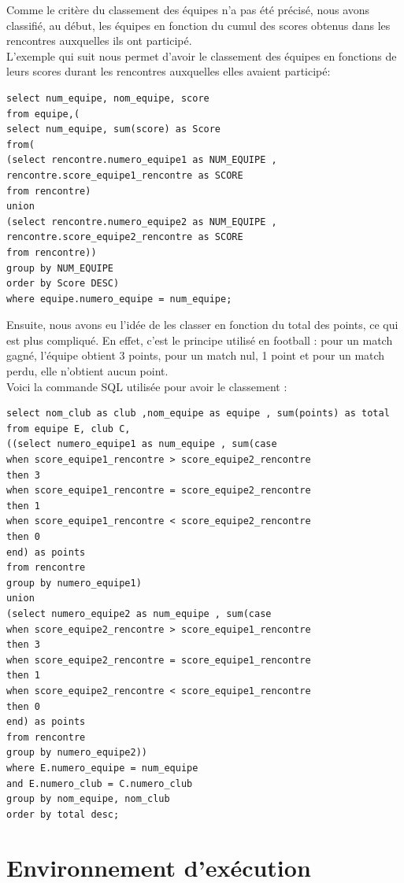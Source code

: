 \documentclass{article}
\begin{document}
Comme le critère du classement des équipes n'a pas été précisé, nous avons classifié, au début, les équipes en fonction du cumul des scores obtenus dans les rencontres auxquelles ils ont participé. \\
L'exemple qui suit nous permet d'avoir le classement des équipes en fonctions de leurs scores durant les rencontres auxquelles elles avaient participé: \\

\begin{verbatim}
select num_equipe, nom_equipe, score
from equipe,(
select num_equipe, sum(score) as Score
from(
(select rencontre.numero_equipe1 as NUM_EQUIPE , rencontre.score_equipe1_rencontre as SCORE
from rencontre)
union
(select rencontre.numero_equipe2 as NUM_EQUIPE , rencontre.score_equipe2_rencontre as SCORE
from rencontre))
group by NUM_EQUIPE
order by Score DESC)
where equipe.numero_equipe = num_equipe;
\end{verbatim}

Ensuite, nous avons eu l'idée de les classer en fonction du total des points, ce qui est plus compliqué. En effet, c'est le principe utilisé en football : pour un match gagné, l'équipe obtient 3 points, pour un match nul, 1 point et pour un match perdu, elle n'obtient aucun point.  \\
Voici la commande SQL utilisée pour avoir le classement : \\

\begin{verbatim}
select nom_club as club ,nom_equipe as equipe , sum(points) as total
from equipe E, club C,
((select numero_equipe1 as num_equipe , sum(case
when score_equipe1_rencontre > score_equipe2_rencontre 
then 3
when score_equipe1_rencontre = score_equipe2_rencontre 
then 1
when score_equipe1_rencontre < score_equipe2_rencontre
then 0
end) as points
from rencontre
group by numero_equipe1)
union
(select numero_equipe2 as num_equipe , sum(case
when score_equipe2_rencontre > score_equipe1_rencontre 
then 3
when score_equipe2_rencontre = score_equipe1_rencontre 
then 1
when score_equipe2_rencontre < score_equipe1_rencontre
then 0
end) as points
from rencontre
group by numero_equipe2))
where E.numero_equipe = num_equipe
and E.numero_club = C.numero_club
group by nom_equipe, nom_club
order by total desc;
\end{verbatim}


\newpage
\section{Environnement d'exécution}
\end{document}
